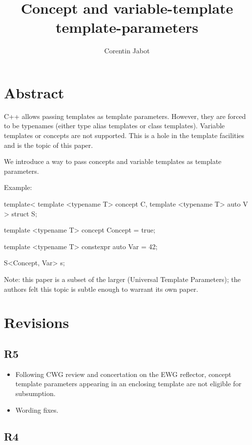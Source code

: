\documentclass{wg21}
\title{Concept and variable-template template-parameters}
\author{Corentin Jabot}{corentin.jabot@gmail.com}
\begin{document}
\maketitle

\section{Abstract}

C++ allows passing templates as template parameters.
However, they are forced to be typenames (either type alias templates or class templates).
Variable templates or concepts are not supported.
This is a hole in the template facilities and is the topic of this paper.

We introduce a way to pass concepts and variable templates as template parameters.

Example:

\begin{colorblock}
template<
   template <typename T> concept C,
   template <typename T> auto V
>
struct S{};

template <typename T>
concept Concept = true;

template <typename T>
constexpr auto Var = 42;

S<Concept, Var> s;
\end{colorblock}

Note: this paper is a subset of the larger  (Universal Template Parameters); the authors felt this topic is subtle enough to warrant its own paper.

\section{Revisions}

\subsection{R5}

\begin{itemize}
\item Following CWG review and concertation on the EWG reflector,
concept template parameters appearing in an enclosing template are not eligible for subsumption.
\item Wording fixes.
\end{itemize}

\subsection{R4}
\end{document}
